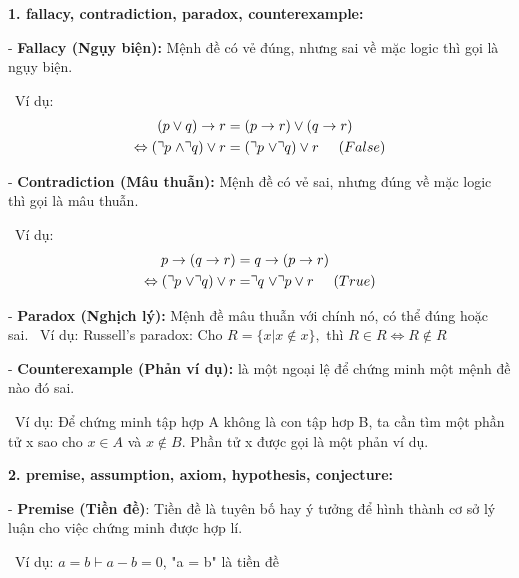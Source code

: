 \documentclass[a4paper]{article}
\begin{document}
\textbf{{\large\hspace{0.5cm} 1. fallacy, contradiction, paradox, counterexample: }}

{\large\hspace{1cm}- \textbf{Fallacy (Ngụy biện):} Mệnh đề có vẻ đúng, nhưng sai về mặc logic thì gọi là ngụy biện.
	
\ Ví dụ:
\begin{align*}
(p \vee q) \rightarrow r &= (p \rightarrow r) \vee (q \rightarrow r) \\
\Leftrightarrow (\urcorner p\hspace{0.1cm} \wedge \urcorner q) \vee r  &= (\urcorner p \hspace{0.1cm} \vee \urcorner q) \vee r \hspace{0.5cm}(False)
\end{align*}}
{\large\hspace{1cm}- \textbf{Contradiction (Mâu thuẫn):} Mệnh đề có vẻ sai, nhưng đúng về mặc logic thì gọi là mâu thuẫn.
	
\ Ví dụ: 
\begin{align*}
p \rightarrow (q \rightarrow r) &= q \rightarrow (p \rightarrow r) \\
\Leftrightarrow (\urcorner p \hspace{0.1cm} \vee \urcorner q) \vee r &= \urcorner q \hspace{0.1cm} \vee \urcorner p \vee r  \hspace{0.5cm} (True)
\end{align*}}
{\large\hspace{1cm}- \textbf{Paradox (Nghịch lý):} Mệnh đề mâu thuẫn với chính nó, có thể đúng hoặc sai.
\ Ví dụ: Russell's paradox: Cho $R = \{x| x\notin x \}, $ thì $ R \in R \Leftrightarrow R \notin R$}

{\large\hspace{1cm}- \textbf{Counterexample (Phản ví dụ):} là một ngoại lệ để chứng minh một mệnh đề nào đó sai.
	
\ Ví dụ: Để chứng minh tập hợp A không là con tập hơp B, ta cần tìm một phần tử x sao cho $x \in A$ và $x\notin B$. Phần tử x được gọi là một phản ví dụ.}

\textbf{{\large\hspace{0.5cm} 2. premise, assumption, axiom, hypothesis, conjecture: }}

{\large\hspace{1cm}- \textbf{Premise (Tiền đề)}: Tiền đề là tuyên bố hay ý tưởng để hình thành cơ sở lý luận cho việc chứng minh được hợp lí.
	
\ Ví dụ: $a = b \vdash a - b = 0$, "a = b" là tiền đề}
\end{document}
